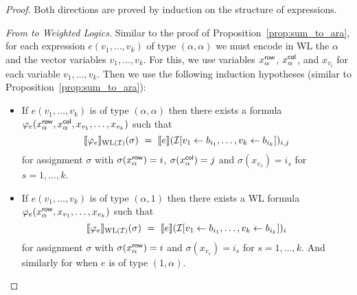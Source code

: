 \begin{proof}
Both directions are proved by induction on the structure of expressions.

\smallskip


\noindent \emph{From \langprod to Weighted Logics.} 
Similar to the proof of Proposition~\ref{prop:sum_to_ara}, for each expression $e(v_1, \ldots, v_k)$ of type $(\alpha, \alpha)$ we must encode in WL the $\alpha$ and the vector variables $v_1, \ldots, v_k$. For this, we use variables $x_{\alpha}^{\mathsf{row}}$, $x_{\alpha}^{\mathsf{col}}$, and $x_{v_i}$ for each variable $v_1, \ldots, v_k$. Then we use the following induction hypotheses (similar to Proposition~\ref{prop:sum_to_ara}):

\newcommand{\varphie}{\varphi_e}
\newcommand{\xr}{x_{\alpha}^\row}
\newcommand{\xc}{x_{\alpha}^\col}

\begin{itemize}
	\item If $e(v_1,\ldots,v_k)$ is of type $(\alpha,\alpha)$ then there exists a formula $\varphie(x_{\alpha}^\row,x_{\alpha}^\col, x_{v_1}, \ldots, x_{v_k})$ such that
	$$
	\ssem{\varphie}{\text{WL}(\I)}(\sigma) \ = \ \sem{e}{\I[v_1\gets b_{i_1},\ldots,v_k\gets b_{i_k}]}_{i,j}
	$$
	for assignment $\sigma$ with $\sigma(\xr)=i$, $\sigma(\xc)=j$ and $\sigma(x_{v_s})=i_s$ for $s=1,\ldots, k$.
	
	\item If $e(v_1,\ldots,v_k)$ is of type $(\alpha,1)$ then there exists a WL formula $\varphie(x_{\alpha}^\row, x_{v_1}, \ldots, x_{v_k})$ such that
	$$
	\ssem{\varphie}{\text{WL}(\I)}(\sigma) \ = \ \sem{e}{\I[v_1\gets b_{i_1},\ldots,v_k\gets b_{i_k}]}_{i}
	$$
	for assignment $\sigma$ with $\sigma(\xr)=i$ and $\sigma(x_{v_s})=i_s$ for $s=1,\ldots, k$.
	And similarly for when $e$ is of type $(1,\alpha)$.
	

\end{itemize}
\end{proof}
